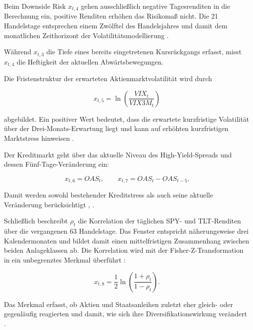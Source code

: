 \vspace{0.5cm}

Beim Downside Risk $x_{t,4}$ gehen ausschließlich negative Tagesrenditen in die Berechnung ein, positive Renditen erhöhen das Risikomaß nicht. Die 21 Handelstage entsprechen einem Zwölftel des Handelsjahres und damit dem monatlichen Zeithorizont der Volatilitätsmodellierung \cite[10-12]{bazan-palomino_volatility_2026}.

\vspace{0.5cm}

Während $x_{t,3}$ die Tiefe eines bereits eingetretenen Kursrückgangs erfasst, misst $x_{t,4}$ die Heftigkeit der aktuellen Abwärtsbewegungen.

\vspace{0.5cm}

Die Fristenstruktur der erwarteten Aktienmarktvolatilität wird durch

$$
x_{t,5}
=
\ln\left(\frac{VIX_t}{VIX3M_t}\right)
$$

abgebildet. Ein positiver Wert bedeutet, dass die erwartete kurzfristige Volatilität über der Drei-Monats-Erwartung liegt und kann auf erhöhten kurzfristigen Marktstress hinweisen \cite[2467]{johnson_risk_2015}.

\vspace{0.5cm}

Der Kreditmarkt geht über das aktuelle Niveau des High-Yield-Spreads und dessen Fünf-Tage-Veränderung ein:

$$
x_{t,6}=OAS_t,
\qquad
x_{t,7}=OAS_t-OAS_{t-5}.
$$

Damit werden sowohl bestehender Kreditstress als auch seine aktuelle Veränderung berücksichtigt \cite{polavarapu_cross-asset_2026}, \cite[1692–1694]{gilchrist_credit_2012}.

\vspace{0.5cm}

Schließlich beschreibt $\rho_t$ die Korrelation der täglichen SPY- und TLT-Renditen über die vergangenen 63 Handelstage. Das Fenster entspricht näherungsweise drei Kalendermonaten und bildet damit einen mittelfristigen Zusammenhang zwischen beiden Anlageklassen ab. Die Korrelation wird mit der Fisher-Z-Transformation in ein unbegrenztes Merkmal überführt \cite[909–911]{barndorff-nielsen_econometric_2004}:

$$
x_{t,8}
=
\frac{1}{2}
\ln\left(\frac{1+\rho_t}{1-\rho_t}\right).
$$

Das Merkmal erfasst, ob Aktien und Staatsanleihen zuletzt eher gleich- oder gegenläufig reagierten und damit, wie sich ihre Diversifikationswirkung verändert \cite[27-29]{page_when_2018}.


